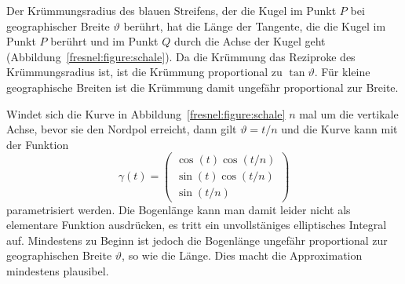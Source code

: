 Der Krümmungsradius des blauen Streifens, der die Kugel im Punkt $P$ bei 
geographischer Breite $\vartheta$ berührt, hat die Länge der Tangente, die
die Kugel im Punkt $P$ berührt und im Punkt $Q$ durch die Achse der
Kugel geht (Abbildung~\ref{fresnel:figure:schale}).
Da die Krümmung das Reziproke des Krümmungsradius ist, ist die
Krümmung proportional zu $\tan\vartheta$.
Für kleine geographische Breiten ist die Krümmung damit ungefähr
proportional zur Breite.

Windet sich die Kurve in Abbildung~\ref{fresnel:figure:schale} $n$
mal um die vertikale Achse, bevor sie den Nordpol erreicht, dann gilt
$\vartheta = t/n$ und die Kurve kann mit der Funktion
\[
\gamma(t)
=
\begin{pmatrix}
\cos(t) \cos(t/n) \\
\sin(t) \cos(t/n) \\
\sin(t/n)
\end{pmatrix}
\]
parametrisiert werden.
Die Bogenlänge kann man damit leider nicht als elementare Funktion
ausdrücken, es tritt ein unvollstäniges elliptisches Integral auf.
Mindestens zu Beginn ist jedoch die Bogenlänge ungefähr proportional
zur geographischen Breite $\vartheta$, so wie die Länge.
Dies macht die Approximation mindestens plausibel.






